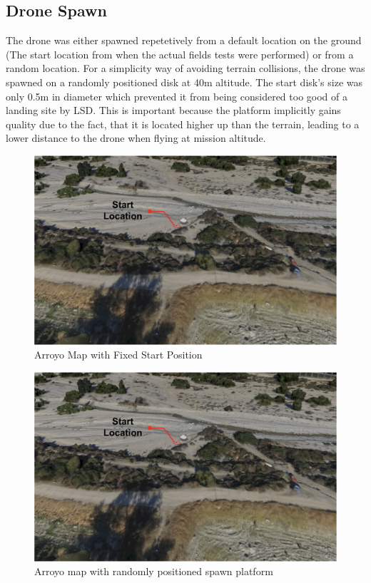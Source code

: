 \subsection{Drone Spawn}
The drone was either spawned repetetively from a default location on the ground (The start location from when the actual fields tests were performed) or from a random location. For a simplicity way of  avoiding terrain collisions, the drone was spawned on a randomly positioned disk at 40m altitude. The start disk's size was only 0.5m in diameter which prevented it from being considered too good of a landing site by LSD. This is important because the platform implicitly gains quality due to the fact, that it is located higher up than the terrain, leading to a lower distance to the drone when flying at mission altitude.
\begin{figure}
    \centering
    \includegraphics[scale=0.42]{images/evaluation/arroyo_with_start.png}
    \caption{Arroyo Map with Fixed Start Position}
\end{figure}
\begin{figure}
    \centering
    \includegraphics[scale=0.42]{images/evaluation/arroyo_with_start.png}
    \caption{Arroyo map with randomly positioned spawn platform}
\end{figure}

